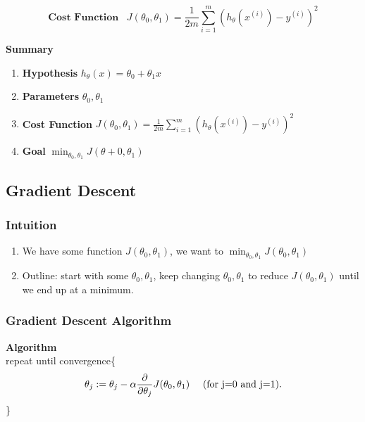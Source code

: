       \begin{equation} 
          \boxed{ 
              \textbf{Cost Function}\hspace{10pt} J(\theta_0, \theta_1) = \frac{1}{2m} \sum_{i=1}^{m} (h_\theta(x^{(i)}) - y^{(i)} )^2
      }
          \label{eq:cost}
      \end{equation}
      

      \par \textbf{Summary} 
      \begin{enumerate}
          \item \textbf{Hypothesis  }$h_\theta (x) = \theta_0 + \theta_1x$
          \item \textbf{Parameters } $\theta_0, \theta_1$
          \item \textbf{Cost Function }$J(\theta_0, \theta_1) = \frac{1}{2m} \sum_{i=1}^{m} (h_\theta(x^{(i)}) - y^{(i)} )^2$
          \item \textbf{Goal } $\min_{\theta_0, \theta_1} J(\theta+0, \theta_1)$
    
      \end{enumerate}
        

          
   
    
    \subsection{Gradient Descent}
        \subsubsection{Intuition}
            \begin{enumerate}
                \item We have some function $J(\theta_0, \theta_1)$, we want to $\min_{\theta_0, \theta_1} J (\theta_0, \theta_1)$
                \item Outline: start with some $\theta_0, \theta_1$, keep changing  $\theta_0, \theta_1$ to reduce $J(\theta_0, \theta_1)$ until we end up at a minimum. 
            \end{enumerate}
        \subsubsection{Gradient Descent Algorithm}
            \textbf{Algorithm} \\
                repeat until convergence\{  
                    \[ \theta_j := \theta_j - \alpha \frac{\partial }{\partial \theta_j} J(\theta_0, \theta_1)\mbox{\hspace{10pt} (for j=0 and j=1)} 
                   .\] \}
        \\


